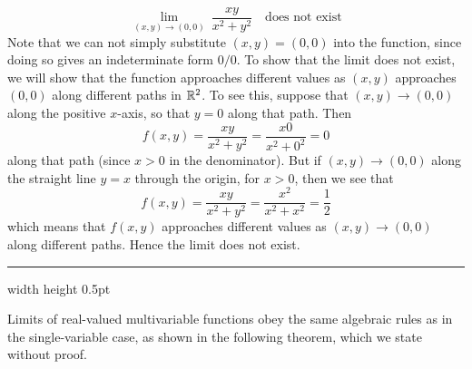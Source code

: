 \begin{exmp}
 \begin{displaymath}
 \lim_{(x,y) \to (0,0)}~ \frac{xy}{x^2 + y^2} \text{~~~does not exist}
 \end{displaymath}
 Note that we can not simply substitute $(x,y) = (0,0)$ into the function, since doing so gives an indeterminate
 form $0/0$. To show that the limit does not exist, we will show that the function approaches different values as
 $(x,y)$ approaches $(0,0)$ along different paths in $\mathbb{R}^{2}$.
 To see this, suppose that $(x,y) \rightarrow (0,0)$ along the positive $x$-axis, so that $y = 0$ along that path. Then
 \begin{displaymath}
  f(x,y) = \frac{xy}{x^2 + y^2} = \frac{x 0}{x^2 + 0^2} = 0
 \end{displaymath}
 along that path (since $x > 0$ in the denominator). But if
 $(x,y) \rightarrow (0,0)$ along the straight line $y = x$ through the origin, for $x > 0$, then we see that
 \begin{displaymath}
  f(x,y) = \frac{xy}{x^2 + y^2} = \frac{x^2}{x^2 + x^2} = \frac{1}{2}
 \end{displaymath}
 which means that $f(x,y)$ approaches different values as $(x,y) \rightarrow (0,0)$ along different paths. Hence the
 limit does not exist.
\end{exmp}
\hrule width \textwidth height 0.5pt
\vspace{4mm}

Limits of real-valued multivariable functions obey the same algebraic rules as in the single-variable case, as shown
in the following theorem, which we state without proof.

